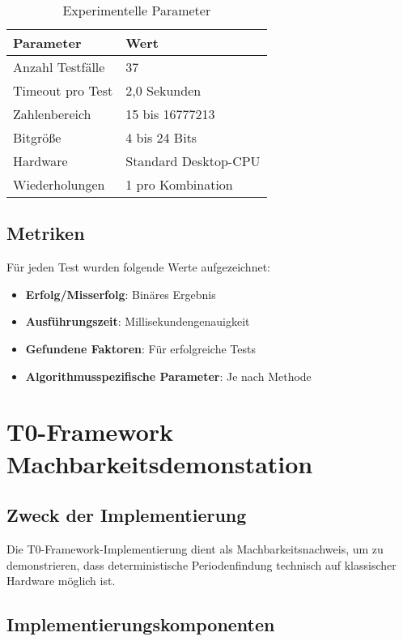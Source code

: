 \documentclass[12pt,a4paper]{article}
\begin{document}
	\begin{table}[H]
		\centering
		\caption{Experimentelle Parameter}
		\begin{tabular}{ll}
			\toprule
			\textbf{Parameter} & \textbf{Wert} \\
			\midrule
			Anzahl Testfälle & 37 \\
			Timeout pro Test & 2,0 Sekunden \\
			Zahlenbereich & 15 bis 16777213 \\
			Bitgröße & 4 bis 24 Bits \\
			Hardware & Standard Desktop-CPU \\
			Wiederholungen & 1 pro Kombination \\
			\bottomrule
		\end{tabular}
		\label{tab:test_config}
	\end{table}
	
	\subsection{Metriken}
	
	Für jeden Test wurden folgende Werte aufgezeichnet:
	\begin{itemize}
		\item \textbf{Erfolg/Misserfolg}: Binäres Ergebnis
		\item \textbf{Ausführungszeit}: Millisekundengenauigkeit
		\item \textbf{Gefundene Faktoren}: Für erfolgreiche Tests
		\item \textbf{Algorithmusspezifische Parameter}: Je nach Methode
	\end{itemize}
	
	\section{T0-Framework Machbarkeitsdemonstation}
	
	\subsection{Zweck der Implementierung}
	
	Die T0-Framework-Implementierung dient als Machbarkeitsnachweis, um zu demonstrieren, dass deterministische Periodenfindung technisch auf klassischer Hardware möglich ist.
	
	\subsection{Implementierungskomponenten}
	
\end{document}
